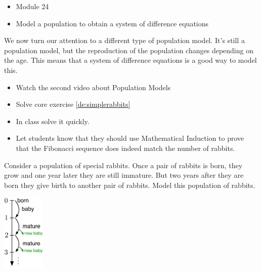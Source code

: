 \begin{lesson}

	\begin{itemize}
		\item Module 24
	\end{itemize}

	\begin{itemize}
		\item Model a population to obtain a system of difference equations
	\end{itemize}
	

We now turn our attention to a different type of population model. 
It's still a population model, but the reproduction of the population changes depending on the age.
This means that a system of difference equations is a good way to model this.

\begin{itemize}
	\item Watch the second video about Population Models
	\item Solve core exercise \ref{de:simplerabbits}
\end{itemize}
\end{lesson}



\begin{annotation}
	\begin{goals}
		\begin{itemize}
			\item In class solve it quickly.
			\item Let students know that they should use Mathematical Induction to prove that the Fibonacci sequence does indeed match the number of rabbits.
		\end{itemize}
\end{goals}
\end{annotation}
\begin{minipage}{.7\textwidth}
\question \label{de:simplerabbits}
	Consider a population of special rabbits. Once a pair of rabbits is born, they grow and one year later they are still immature. But two years after they are born they give birth to another pair of rabbits.
	Model this population of rabbits.
\end{minipage}
\hfill
\begin{minipage}{58pt}
	\includegraphics*[width=58pt]{images/module24-simple-life.pdf}
\end{minipage}
	


